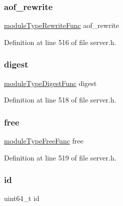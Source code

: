 \subsubsection{\texorpdfstring{aof\+\_\+rewrite}{aof\_rewrite}}
{\footnotesize\ttfamily \hyperlink{server_8h_a40830f84874e380a79a349e91552d187}{module\+Type\+Rewrite\+Func} aof\+\_\+rewrite}



Definition at line 516 of file server.\+h.

\mbox{\label{struct_redis_module_type_ad99df9c318d570861b92496bbf158efa}} 
\subsubsection{\texorpdfstring{digest}{digest}}
{\footnotesize\ttfamily \hyperlink{server_8h_abd6a3739d32c76c9d560324215668d1b}{module\+Type\+Digest\+Func} digest}



Definition at line 518 of file server.\+h.

\mbox{\label{struct_redis_module_type_a966c47580ef5f4abf50e4109df7168ad}} 
\subsubsection{\texorpdfstring{free}{free}}
{\footnotesize\ttfamily \hyperlink{server_8h_a3106a404efe2080365b6b39517601a45}{module\+Type\+Free\+Func} free}



Definition at line 519 of file server.\+h.

\mbox{\label{struct_redis_module_type_a7e290573ef1be67b92a2c745e3b00d1d}} 
\subsubsection{\texorpdfstring{id}{id}}
{\footnotesize\ttfamily uint64\+\_\+t id}




